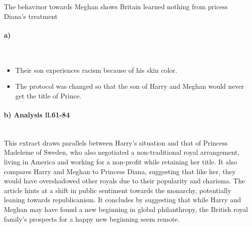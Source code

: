 \documentclass[a4paper,12pt]{report}
\begin{document}
	\noindent
	\Large The behaviuor towards Meghan shows Britain
learned nothing from pricess Diana's treatment

	\large
	\paragraph{a)} \mbox{} \\
	\begin{itemize}
		\item Their son experiences racism because of his skin color.
		\item The protocol was changed so that the son of Harry and Meghan would never get the title of Prince.
	\end{itemize}
	\paragraph{b) Analysis ll.61-84} \mbox{} \\
	This extract draws parallels between Harry's situation and that of Princess Madeleine of Sweden, who also negotiated a non-traditional royal arrangement, living in America and working for a non-profit while retaining her title.
	It also compares Harry and Meghan to Princess Diana, suggesting that like her, they would have overshadowed other royals due to their popularity and charisma.
	The article hints at a shift in public sentiment towards the monarchy, potentially leaning towards republicanism.
	 It concludes by suggesting that while Harry and Meghan may have found a new beginning in global philanthropy, the British royal family's prospects for a happy new beginning seem remote.
\end{document}
